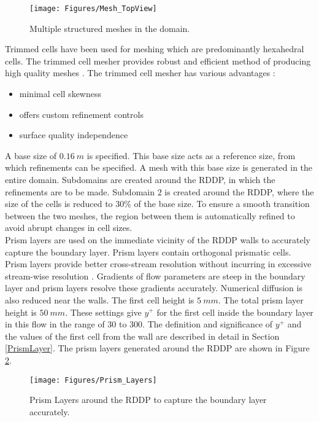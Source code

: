 \begin{figure}
\centering
\texttt{[image: Figures/Mesh\_TopView]}
\caption{\label{fig:Mesh_TopView}Multiple structured meshes in the domain.}
\end{figure}
\noindent Trimmed cells have been used for meshing which are predominantly hexahedral cells. The trimmed cell mesher provides robust and efficient method of producing high quality meshes \cite{TrimmedCells}. The trimmed cell mesher has various advantages \cite{TrimmedCells}:
\begin{itemize}
\itemsep0em %
\item minimal cell skewness
\item offers custom refinement controls
\item surface quality independence
\end{itemize}
A base size of $0.16~m$ is specified. This base size acts as a reference size, from which refinements can be specified. A mesh with this base size is generated in the entire domain. Subdomains are created around the RDDP, in which the refinements are to be made. Subdomain $2$ is created around the RDDP, where the size of the cells is reduced to $30\%$ of the base size. To ensure a smooth transition between the two meshes, the region between them is automatically refined to avoid abrupt changes in cell sizes.\\
Prism layers are used on the immediate vicinity of the RDDP walls to accurately capture the boundary layer. Prism layers contain orthogonal prismatic cells. Prism layers provide better cross-stream resolution without incurring in excessive stream-wise resolution \cite{PrismLayers}. Gradients of flow parameters are steep in the boundary layer and prism layers resolve these gradients accurately. Numerical diffusion is also reduced near the walls. The first cell height is $5~mm$. The total prism layer height is $50~mm$. These settings give $y^+$ for the first cell inside the boundary layer in this flow in the range of 30 to 300. The definition and significance of $y^+$ and the values of the first cell from the wall are described in detail in Section \ref{PrismLayer}. The prism layers generated around the RDDP are shown in Figure \ref{fig:Prism_Layers}.\\

\begin{figure}
\centering
\texttt{[image: Figures/Prism\_Layers]}
\caption{\label{fig:Prism_Layers}Prism Layers around the RDDP to capture the boundary layer accurately.}
\end{figure}

